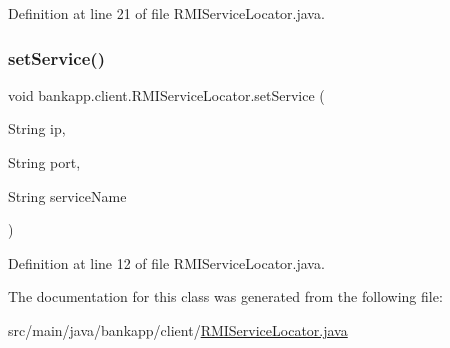 Definition at line 21 of file R\+M\+I\+Service\+Locator.\+java.

\mbox{\label{classbankapp_1_1client_1_1_r_m_i_service_locator_a9a1605fa6be3933008e90db56b804007}} 
\subsubsection{\texorpdfstring{set\+Service()}{setService()}}
{\footnotesize\ttfamily void bankapp.\+client.\+R\+M\+I\+Service\+Locator.\+set\+Service (\begin{DoxyParamCaption}\item[{String}]{ip,  }\item[{String}]{port,  }\item[{String}]{service\+Name }\end{DoxyParamCaption})}



Definition at line 12 of file R\+M\+I\+Service\+Locator.\+java.



The documentation for this class was generated from the following file\+:\begin{DoxyCompactItemize}
\item 
src/main/java/bankapp/client/\hyperlink{_r_m_i_service_locator_8java}{R\+M\+I\+Service\+Locator.\+java}\end{DoxyCompactItemize}

